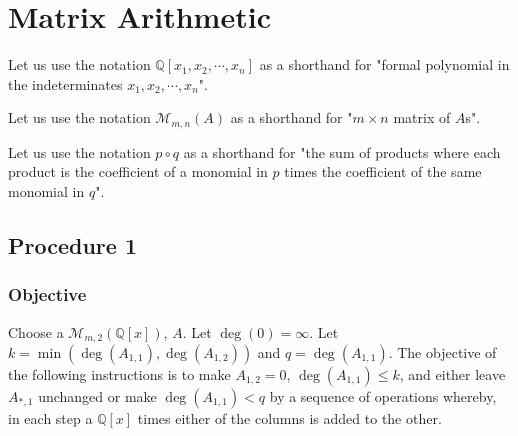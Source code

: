 \documentclass[twocolumn]{article}
\begin{document}
	\section{Matrix Arithmetic}\label{sec:body}
		Let us use the notation $\mathbb{Q}[x_1,x_2,\cdots,x_n]$ as a shorthand for "formal polynomial in the indeterminates $x_1,x_2,\cdots,x_n$".
		
		Let us use the notation $\mathcal{M}_{m,n}(A)$ as a shorthand for "$m\times n$ matrix of $A$s".
		
		Let us use the notation $p\circ q$ as a shorthand for "the sum of products where each product is the coefficient of a monomial in $p$ times the coefficient of the same monomial in $q$".
		\subsection{Procedure 1}\label{sec:procedure 1}
			\subsubsection{Objective}
				Choose a $\mathcal{M}_{m,2}(\mathbb{Q}[x])$, $A$. Let $\deg(0)=\infty$. Let $k=\min(\deg(A_{1,1}),\deg(A_{1,2}))$ and $q=\deg(A_{1,1})$. The objective of the following instructions is to make $A_{1,2}=0$, $\deg(A_{1,1})\le k$, and either leave $A_{*,1}$ unchanged or make $\deg(A_{1,1})<q$ by a sequence of operations whereby, in each step a $\mathbb{Q}[x]$ times either of the columns is added to the other.
\end{document}
